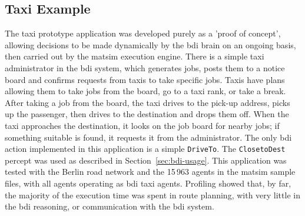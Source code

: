 \subsection{Taxi Example}
The taxi prototype application was developed purely as a 'proof of
concept', allowing decisions to be made dynamically by the \gls{bdi}
brain on an ongoing basis, then carried out by the \gls{matsim} execution
engine. There is a simple taxi administrator in the \gls{bdi} system, which
generates jobs, posts them to a notice board and confirms requests
from taxis to take specific jobs. Taxis have plans allowing them to
take jobs from the board, go to a taxi rank, or take a break. After
taking a job from the board, the taxi drives to the pick-up address,
picks up the passenger, then drives to the destination and drops
them off. When the taxi approaches the destination, it looks
on the job board for nearby jobs;  if something suitable is found,
it requests it from the administrator. The only \gls{bdi} action implemented
in this application is a simple \lstinline{DriveTo}. The
\lstinline{ClosetoDest} percept was used as described in Section~\ref{sec:bdi-usage}. 
This application was tested with the Berlin road network
and the 15\,963 agents in the \gls{matsim} sample files, with all agents
operating as \gls{bdi} taxi agents. Profiling showed that, by far, the
majority of the execution time was spent in route planning, with very
little in the \gls{bdi} reasoning, or communication with the \gls{bdi} system.

